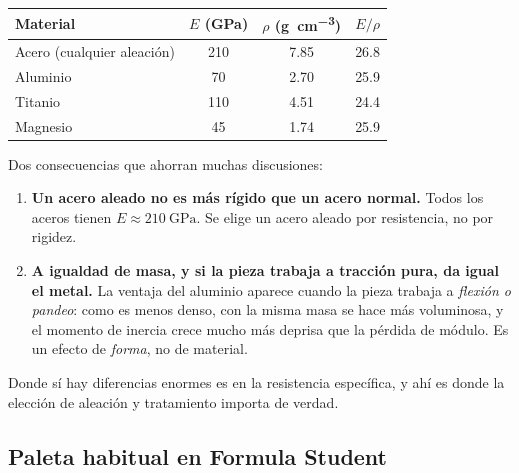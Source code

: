\begin{center}
\begin{tabular}{@{}lSSS@{}}
\toprule
\textbf{Material} & {$E$ (\si{\giga\pascal})} & {$\rho$ (\si{\gram\per\cubic\centi\meter})} & {$E/\rho$} \\
\midrule
Acero (cualquier aleación) & 210 & 7.85 & 26.8 \\
Aluminio                   & 70  & 2.70 & 25.9 \\
Titanio                    & 110 & 4.51 & 24.4 \\
Magnesio                   & 45  & 1.74 & 25.9 \\
\bottomrule
\end{tabular}
\end{center}

\begin{clave}
Dos consecuencias que ahorran muchas discusiones:

\begin{enumerate}
  \item \textbf{Un acero aleado no es más rígido que un acero normal.} Todos los
        aceros tienen $E \approx \SI{210}{\giga\pascal}$. Se elige un acero
        aleado por resistencia, no por rigidez.
  \item \textbf{A igualdad de masa, y si la pieza trabaja a tracción pura, da
        igual el metal.} La ventaja del aluminio aparece cuando la pieza trabaja a
        \emph{flexión o pandeo}: como es menos denso, con la misma masa se hace
        más voluminosa, y el momento de inercia crece mucho más deprisa que la
        pérdida de módulo. Es un efecto de \emph{forma}, no de material.
\end{enumerate}
\end{clave}

Donde sí hay diferencias enormes es en la resistencia específica, y ahí es donde
la elección de aleación y tratamiento importa de verdad.

\subsection{Paleta habitual en Formula Student}

